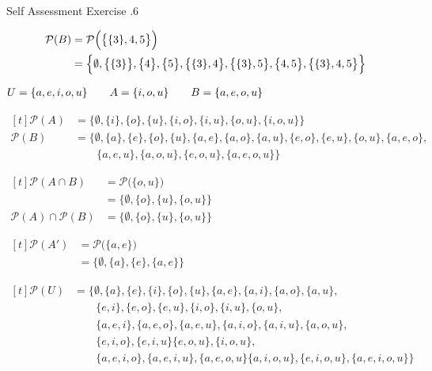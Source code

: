 \documentclass[\main/notes.tex]{subfiles}
\begin{document}
\begin{exercise}{Self Assessment Exercise \thechapter.6}
\begin{questions}
\begin{answer}
\begin{align*}
								\mathcal{P}(B) &= \mathcal{P}\Bigl(\bigl\{\{3\}, 4, 5\bigr\}\Bigr)\\
								&= \Bigl\{\emptyset, \bigl\{\{3\}\bigr\}, \bigl\{4\bigr\}, \bigl\{5\bigr\}, \bigl\{\{3\}, 4\bigr\}, \bigl\{\{3\}, 5\bigr\}, \bigl\{4, 5\bigr\}, \bigl\{\{3\}, 4, 5\bigr\}\Bigr\}
							\end{align*}
						\end{answer}
					\pagebreak
					\item \hfill $
						\begin{alignedat}[t]{3}
							U &= \{a, e, i, o, u\} \qquad & A &= \{i, o, u\} \qquad & B &= \{a, e, o, u\}
						\end{alignedat} $ \hfill \phantom{4 \quad}
						\begin{questions}[labelsep=1em, first=\answer]
							\item $
								\begin{aligned}[t]
									\mathcal{P}(A) &= \bigl\{\emptyset, \{i\}, \{o\}, \{u\}, \{i, o\}, \{i, u\}, \{o, u\}, \{i, o, u\}\bigr\}\\
									\mathcal{P}(B) &= \bigl\{\emptyset, \{a\}, \{e\}, \{o\}, \{u\}, \{a, e\}, \{a, o\}, \{a, u\}, \{e, o\}, \{e, u\}, \{o, u\}, \{a, e, o\},\\
									& \qquad \{a, e, u\}, \{a, o, u\}, \{e, o, u\}, \{a, e, o, u\}\bigr\}
								\end{aligned} $
							\item $
								\begin{aligned}[t]
									\mathcal{P}(A \cap B) &= \mathcal{P}\bigl(\{o, u\}\bigr)\\
									&= \bigl\{\emptyset, \{o\}, \{u\}, \{o, u\}\bigr\}\\
									\mathcal{P}(A) \cap \mathcal{P}(B) &= \bigl\{\emptyset, \{o\}, \{u\}, \{o, u\}\bigr\}
								\end{aligned} $
							\item $
								\begin{aligned}[t]
									\mathcal{P}\left(A'\right) &= \mathcal{P}\bigl(\{a, e\}\bigr)\\
									&= \bigl\{\emptyset, \{a\}, \{e\}, \{a, e\}\bigr\}
								\end{aligned}$

								$\begin{aligned}[t]
									\mathcal{P}(U) &= \bigl\{\emptyset, \{a\}, \{e\}, \{i\}, \{o\}, \{u\}, \{a, e\}, \{a, i\}, \{a, o\}, \{a, u\},\\
									& \qquad \{e, i\}, \{e, o\}, \{e, u\}, \{i, o\}, \{i, u\}, \{o, u\},\\
									& \qquad \{a, e, i\}, \{a, e, o\}, \{a, e, u\}, \{a, i, o\}, \{a, i, u\}, \{a, o, u\},\\
									& \qquad \{e, i, o\}, \{e, i, u\} \{e, o, u\}, \{i, o, u\},\\
									& \qquad \{a, e, i, o\}, \{a, e, i, u\}, \{a, e, o, u\} \{a, i, o, u\}, \{e, i, o, u\}, \{a, e, i, o, u\}\bigr\}
								\end{aligned} $


\end{questions}
\end{questions}
\end{exercise}
\end{document}
